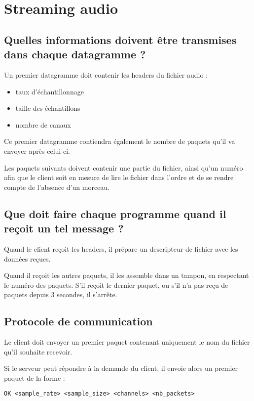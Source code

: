 \documentclass[a4paper,10pt,openany,oneside]{report}
\begin{document}
\section{Streaming audio}

\subsection{Quelles informations doivent être transmises dans chaque
            datagramme ?}

Un premier datagramme doit contenir les headers du fichier audio :

\begin{itemize}
    \item taux d'échantillonnage
    \item taille des échantillons
    \item nombre de canaux
\end{itemize}

Ce premier datagramme contiendra également le nombre de paquets qu'il va
envoyer après celui-ci.

Les paquets suivants doivent contenir une partie du fichier, ainsi qu'un numéro
afin que le client soit en mesure de lire le fichier dans l'ordre et de se
rendre compte de l'absence d'un morceau.

\subsection{Que doit faire chaque programme quand il reçoit un tel message ?}

Quand le client reçoit les headers, il prépare un descripteur de fichier avec
les données reçues.

Quand il reçoit les autres paquets, il les assemble dans un tampon, en
respectant le numéro des paquets. S'il reçoit le dernier paquet, ou s'il n'a
pas reçu de paquets depuis 3 secondes, il s'arrête.

\subsection{Protocole de communication}

Le client doit envoyer un premier paquet contenant uniquement le nom du fichier
qu'il souhaite recevoir.

Si le serveur peut répondre à la demande du client, il envoie alors un premier
paquet de la forme :

\begin{verbatim}
OK <sample_rate> <sample_size> <channels> <nb_packets>
\end{verbatim}
\end{document}
